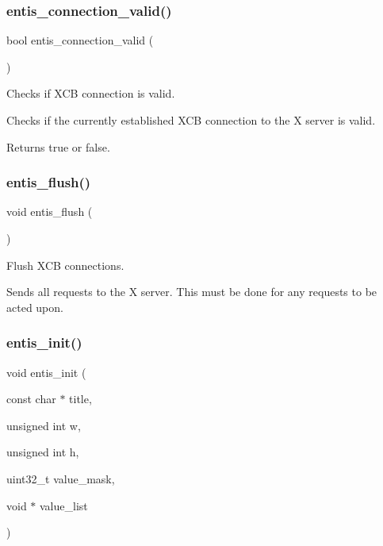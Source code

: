 \subsubsection{\texorpdfstring{entis\+\_\+connection\+\_\+valid()}{entis\_connection\_valid()}}
{\footnotesize\ttfamily bool entis\+\_\+connection\+\_\+valid (\begin{DoxyParamCaption}{ }\end{DoxyParamCaption})}



Checks if X\+CB connection is valid. 

Checks if the currently established X\+CB connection to the X server is valid.

\begin{DoxyReturn}{Returns}
{\ttfamily true} or {\ttfamily false}. 
\end{DoxyReturn}
\mbox{\label{group__General_gaae109a468964f275fa2deebd567b9aba}} 
\subsubsection{\texorpdfstring{entis\+\_\+flush()}{entis\_flush()}}
{\footnotesize\ttfamily void entis\+\_\+flush (\begin{DoxyParamCaption}{ }\end{DoxyParamCaption})}



Flush X\+CB connections. 

Sends all requests to the X server. This must be done for any requests to be acted upon. \mbox{\label{group__General_ga9b2e862fe151d11a2f6564ff7c15688d}} 
\subsubsection{\texorpdfstring{entis\+\_\+init()}{entis\_init()}}
{\footnotesize\ttfamily void entis\+\_\+init (\begin{DoxyParamCaption}\item[{const char $\ast$}]{title,  }\item[{unsigned int}]{w,  }\item[{unsigned int}]{h,  }\item[{uint32\+\_\+t}]{value\+\_\+mask,  }\item[{void $\ast$}]{value\+\_\+list }\end{DoxyParamCaption})}



